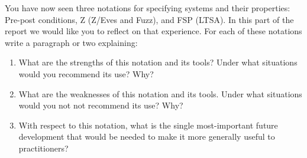 \documentclass{article}
\begin{document}
 You have now seen three notations for specifying systems and their properties: Pre-post conditions,
 Z (Z/Eves and Fuzz), and FSP (LTSA).  In this part of the report we would like you to reflect on that experience.
 For each of these notations write a paragraph or two explaining:
\begin{enumerate}
 \item What are the strengths of this notation and its tools?  Under what situations would you
recommend its use? Why?
 \item What are the weaknesses of this notation and its tools. Under what
situations would you not not recommend its use? Why?
 \item With respect to this notation, what is
the single most-important future development that would be needed to make it more generally useful
to practitioners?

\end{enumerate}
\end{document}

